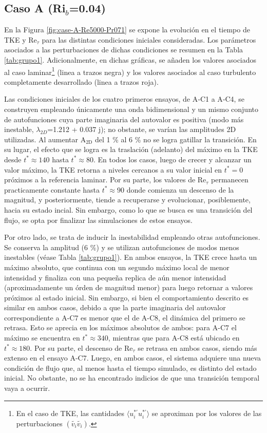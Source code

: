 \subsection{Caso A (Ri$_b$=0.04)}

En la Figura \ref{fig:case-A-Re5000-Pr071} se expone la evolución en el tiempo de TKE y Re$_{\tau}$ para las distintas condiciones iniciales consideradas. Los parámetros asociados a las perturbaciones de dichas condiciones se resumen en la Tabla \ref{tab:grupo1}. Adicionalmente, en dichas gráficas, se añaden los valores asociados al caso laminar\footnote{En el caso de TKE, las cantidades $\langle u^{* \prime}_i u^{* \prime}_i \rangle$ se aproximan por los valores de las perturbaciones $(\widetilde{v_i} \widetilde{v_i})$.} (linea a trazos negra) y los valores asociados al caso turbulento completamente desarrollado (linea a trazos roja).  

Las condiciones iniciales de los cuatro primeros ensayos, de A‑C1 a A‑C4, se construyen empleando únicamente una onda bidimensional y un mismo conjunto de autofunciones cuya parte imaginaria del autovalor es positiva (modo más inestable, $\lambda_{2D}$=1.212 + 0.037 j); no obstante, se varían las amplitudes 2D utilizadas. Al aumentar A$_\text{2D}$ del 1 \% al 6 \%  no se logra gatillar la transición. En su lugar, el efecto que se logra es la traslación (adelanto) del máximo en la TKE desde $t^* \approx 140$ hasta $t^* \approx 80$. En todos los casos, luego de crecer y alcanzar un valor máximo, la TKE retorna a niveles cercanos a su valor inicial en $t^*=0$ próximos a la referencia laminar. Por su parte, los valores de Re$_{\tau}$ permanecen practicamente constante hasta $t^* \approx 90$ donde comienza un descenso de la magnitud, y posteriormente, tiende a recuperarse y evolucionar, posiblemente, hacia su estado incial. Sin embargo, como lo que se busca es una transición del flujo, se opta por finalizar las simulaciones de estos ensayos.  

Por otro lado, se trata de inducir la inestabilidad empleando otras autofunciones. Se conserva la amplitud (6 \%) y se utilizan autofunciones de modos menos inestables (véase Tabla \ref{tab:grupo1}). En ambos ensayos, la TKE crece hasta un máximo absoluto, que continua con un segundo máximo local de menor intensidad y finaliza con una pequeña replica de aún menor intensidad (aproximadamente un órden de magnitud menor) para luego retornar a valores próximos al estado inicial. Sin embargo, si bien el comportamiento descrito es similar en ambos casos, debido a que la parte imaginaria del autovalor correspondiente a A-C7 es menor que el de A-C8, el dinámica del primero se retrasa. Esto se aprecia en los máximos absolutos de ambos: para A-C7 el máximo se encuentra en $t^* \approx 340$, mientras que para A-C8 está ubicado en  $t^* \approx 180$. Por su parte, el descenso de Re$_{\tau}$ se retrasa en ambos casos, siendo más extenso en el ensayo A-C7. Luego, en ambos casos, el sistema adquiere una nueva condición de flujo que, al menos hasta el tiempo simulado, es distinto del estado inicial. No obstante, no se ha encontrado indicios de que una transición temporal vaya a ocurrir.  

